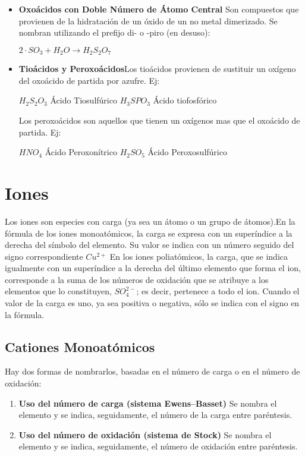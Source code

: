 \documentclass[11pt,fleqn]{book} %
\begin{document}
\begin{itemize}
	\item \textbf{Oxoácidos con Doble Número de Átomo Central} Son compuestos que provienen de la hidratación de un óxido de un no metal dimerizado. Se nombran utilizando el prefijo di- o -piro (en desuso):
	\begin{center}
		$2\cdot SO_3 + H_{2}O \rightarrow H_{2}S_{2}O_{7}$
	\end{center}
	\item \textbf{Tioácidos y Peroxoácidos}Los tioácidos provienen de sustituir un oxígeno del oxoácido de partida por azufre. Ej:
	\begin{center}
		$H_{2}S_{2}O_{3}$   Ácido Tiosulfúrico \hspace{1cm} $H_{3}SPO_3$ Ácido tiofosfórico
	\end{center}
	Los peroxoácidos son aquellos que tienen un oxígenos mas que el oxoácido de partida. Ej:
	\begin{center}
		$HNO_4$    Ácido Peroxonítrico \hspace{1cm} $H_{2}SO_5$   Ácido Peroxosulfúrico
	\end{center}
	
\end{itemize}

\section{Iones}
Los iones son especies con carga (ya sea un átomo o un grupo de átomos).En la fórmula de los iones monoatómicos, la carga se expresa con un superíndice a la derecha del símbolo del elemento. Su valor se indica con un número seguido del signo correspondiente $Cu^{2+}$ En los iones poliatómicos, la carga, que se indica igualmente con un superíndice a la derecha del último elemento que forma el ion, corresponde a la suma de los números de oxidación que se atribuye a los elementos que lo constituyen, $SO_{4}^{2-}$; es decir, pertenece a todo el ion. Cuando el valor de la carga es uno, ya sea positiva o negativa, sólo se indica con el signo en la fórmula.

\subsection{Cationes Monoatómicos}
Hay dos formas de nombrarlos, basadas en el número de carga o en el número de oxidación:\\
\begin{enumerate}
	
	\item \textbf{Uso del número de carga (sistema Ewens–Basset)} Se nombra el elemento y se indica, seguidamente, el número de la carga entre paréntesis.
	
	\item \textbf{Uso del número de oxidación (sistema de Stock)} Se nombra el elemento y se indica, seguidamente, el número de oxidación entre paréntesis.

\end{enumerate}
\end{document}
